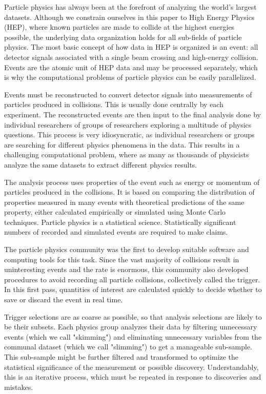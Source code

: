 \documentclass[a4paper]{jpconf}
\begin{document}
Particle physics has always been at the forefront of analyzing the world's largest datasets. Although we constrain ourselves in this paper to High Energy Physics (HEP), where known particles are made to collide at the highest energies possible, the underlying data organization holds for all sub-fields of particle physics. The most basic concept of how data in HEP is organized is an event: all detector signals associated with a single beam crossing and high-energy collision. Events are the atomic unit of HEP data and may be processed separately, which is why the computational problems of particle physics can be easily parallelized. 

Events must be reconstructed to convert detector signals into measurements of particles produced in collisions. This is usually done centrally by each experiment. The reconstructed events are then input to the final analysis done by individual researchers of groups of researchers exploring a multitude of physics questions. This process is very idiosyncratic, as individual researchers or groups are searching for different physics phenomena in the data. This results in a challenging computational problem, where as many as thousands of physicists analyze the same datasets to extract different physics results.

The analysis process uses properties of the event such as energy or momentum of particles produced in the collisions. It is based on comparing the distribution of properties measured in many events with theoretical predictions of the same property, either calculated empirically or simulated using Monte Carlo techniques. Particle physics is a statistical science. Statistically significant numbers of recorded and simulated events are required to make claims.

The particle physics community was the first to develop suitable software and computing tools for this task. Since the vast majority of collisions result in uninteresting events and the rate is enormous, this community also developed procedures to avoid recording all particle collisions, collectively called the trigger. In this first pass, quantities of interest are calculated quickly to decide whether to save or discard the event in real time.

Trigger selections are as coarse as possible, so that analysis selections are likely to be their subsets. Each physics group analyzes their data by filtering unnecessary events (which we call "skimming") and eliminating unnecessary variables from the communal dataset (which we call "slimming") to get a manageable sub-sample. This sub-sample might be further filtered and transformed to optimize the statistical significance of the measurement or possible discovery. Understandably, this is an iterative process, which must be repeated in response to discoveries and mistakes.
\end{document}
